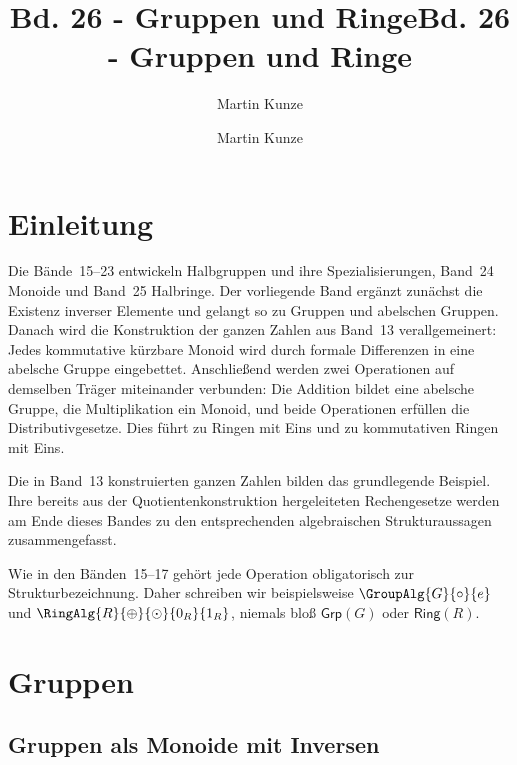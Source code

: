 \documentclass[main.tex]{subfiles}
\title{Bd. 26 - Gruppen und Ringe}
\author{Martin Kunze}
\date{}
\begin{document}
\newcommand{\BandXXVIProofRefStack}[1]{%
  \ensuremath{\begin{gathered}#1\end{gathered}}}

\title{Bd. 26 - Gruppen und Ringe}
\author{Martin Kunze}
\date{}
\hypersetup{pageanchor=false}
\maketitle
\hypersetup{pageanchor=true}
\setcounter{tocdepth}{3}
\tableofcontents
\setcounter{file}{26}
\renewcommand{\FormulaBandID}{26}

\chapter{Einleitung}

Die Bände~15--23 entwickeln Halbgruppen und ihre Spezialisierungen,
Band~24 Monoide und Band~25 Halbringe.
Der vorliegende Band ergänzt zunächst die Existenz inverser Elemente und
gelangt so zu Gruppen und abelschen Gruppen. Danach wird die Konstruktion
der ganzen Zahlen aus Band~13 verallgemeinert: Jedes kommutative kürzbare
Monoid wird durch formale Differenzen in eine abelsche Gruppe eingebettet.
Anschließend werden zwei Operationen auf demselben Träger miteinander
verbunden: Die Addition bildet eine abelsche Gruppe, die Multiplikation ein
Monoid, und beide Operationen erfüllen die Distributivgesetze. Dies führt zu
Ringen mit Eins und zu kommutativen Ringen mit Eins.

Die in Band~13 konstruierten ganzen Zahlen bilden das grundlegende Beispiel.
Ihre bereits aus der Quotientenkonstruktion hergeleiteten Rechengesetze
werden am Ende dieses Bandes zu den entsprechenden algebraischen
Strukturaussagen zusammengefasst.

Wie in den Bänden~15--17 gehört jede Operation obligatorisch zur
Strukturbezeichnung. Daher schreiben wir beispielsweise
\(\GroupAlg{G}{\circ}{e}\) und
\(\RingAlg{R}{\oplus}{\odot}{0_R}{1_R}\), niemals bloß
\(\mathsf{Grp}(G)\) oder \(\mathsf{Ring}(R)\).

\chapter{Gruppen}

\section{Gruppen als Monoide mit Inversen}
\end{document}
